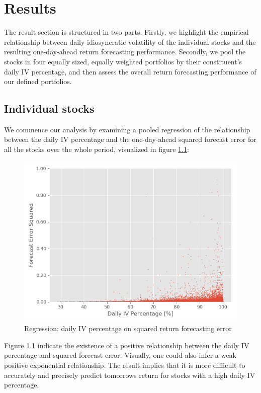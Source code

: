 \chapter{Results}
\label{Results}
The result section is structured in two parts. Firstly, we highlight the empirical relationship between daily idiosyncratic volatility of the individual stocks and the resulting one-day-ahead return forecasting performance. Secondly, we pool the stocks in four equally sized, equally weighted portfolios by their constituent's daily IV percentage, and then assess the overall return forecasting performance of our defined portfolios.

\section{Individual stocks}

We commence our analysis by examining a pooled regression of the relationship between the daily IV percentage and the one-day-ahead squared forecast error for all the stocks over the whole period, visualized in figure \ref{Scatter regression}: 

\begin{figure}[h]
    \centering
    \includegraphics[scale = 0.5]{Plot/ScatterRegression.png}
    \caption{Regression: daily IV percentage on squared return forecasting error}
    \label{Scatter regression}
\end{figure}

Figure \ref{Scatter regression} indicate the existence of a positive relationship between the daily IV percentage and squared forecast error. Visually, one could also infer a weak positive exponential relationship. The result implies that it is more difficult to accurately and precisely predict tomorrows return for stocks with a high daily IV percentage.

